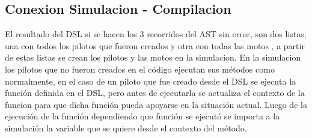 	\subsection{Conexion Simulacion - Compilacion}
	
	El resultado del DSL si se hacen los 3 recorridos del AST sin error, son dos listas, una con todos los pilotos que fueron creados y otra con todas las motos , a partir de estas listas se crean los pilotos y las motos en la simulacion. En la simulacion los pilotos que no fueron creados en el código ejecutan sus métodos como normalmente, en el caso de un piloto que fue creado desde el DSL se ejecuta la función definida en el DSL, pero antes de ejecutarla se actualiza el contexto de la funcion para que dicha función pueda apoyarse en la situación actual. Luego de la ejecución de la función dependiendo que función se ejecutó se importa a la simulación la variable que se quiere desde el contexto del método. 		

		